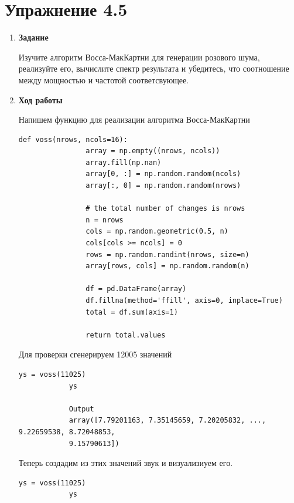 \documentclass[a4paper,12pt]{article}
\begin{document}
	
	\section{Упражнение 4.5}
	
	\begin{enumerate}
		
		\item \textbf{Задание}
		
		Изучите алгоритм Восса-МакКартни для генерации розового шума, реализуйте его, вычислите спектр результата и убедитесь, что соотношение между мощностью и частотой соответсвующее.
		
		\item \textbf{Ход работы}
		
		Напишем функцию для реализации алгоритма Восса-МакКартни
		\begin{lstlisting}[caption=Алгоритм ВОсса-МакКартни]
			def voss(nrows, ncols=16):
				array = np.empty((nrows, ncols))
				array.fill(np.nan)
				array[0, :] = np.random.random(ncols)
				array[:, 0] = np.random.random(nrows)
				
				# the total number of changes is nrows
				n = nrows
				cols = np.random.geometric(0.5, n)
				cols[cols >= ncols] = 0
				rows = np.random.randint(nrows, size=n)
				array[rows, cols] = np.random.random(n)
				
				df = pd.DataFrame(array)
				df.fillna(method='ffill', axis=0, inplace=True)
				total = df.sum(axis=1)
				
				return total.values
		\end{lstlisting}
		
		Для проверки сгенерируем 12005 значений
		\begin{lstlisting}[caption=Генерация значений]
			ys = voss(11025)
			ys
			
			Output
			array([7.79201163, 7.35145659, 7.20205832, ..., 9.22659538, 8.72048853,
			9.15790613])
		\end{lstlisting}
	
		Теперь создадим из этих значений звук и визуализиуем его.
		\begin{lstlisting}[caption=Создание и визуализация звука]
			ys = voss(11025)
			ys
			

\end{lstlisting}
\end{enumerate}
\end{document}
